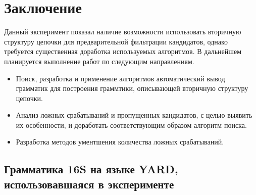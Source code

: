 \documentclass[12pt]{article}  %
\theoremstyle{remark}
\begin{document}

\pagebreak  


\section{Заключение}

Данный эксперимент показал наличие возможности использовать вторичную структуру цепочки для предварительной фильтрации кандидатов, однако требуется существенная доработка используемых алгоритмов.
В дальнейшем планируется выполнение работ по следующим направлениям.
\begin{itemize}
\item Поиск, разработка и применение алгоритмов автоматический вывод грамматик для построения граммтики, описывающей вторичную структуру цепочки.
\item Анализ ложных срабатываний и пропущенных кандидатов, с целью выявить их особенности, и доработать соответствующим образом алгоритм поиска.
\item Разработка методов ументшения количества ложных срабатываний.
\end{itemize}

\begin{appendices}
\section{Грамматика 16S на языке YARD, использовавшаяся в эксперименте}
\label{grammar}

\end{appendices}
\end{document}
